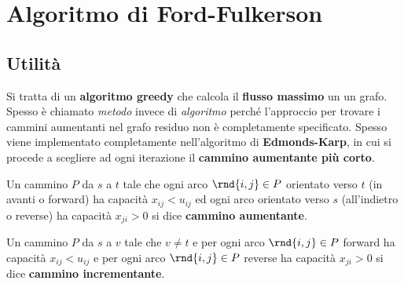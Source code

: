 \documentclass[\main/main.tex]{subfiles}
\begin{document}
\chapter{Algoritmo di Ford-Fulkerson}
\section{Utilità}
Si tratta di un \textbf{algoritmo greedy} che calcola il \textbf{flusso massimo} un un grafo. Spesso è chiamato \textit{metodo} invece di \textit{algoritmo} perché l'approccio per trovare i cammini aumentanti nel grafo residuo non è completamente specificato. Spesso viene implementato completamente nell'algoritmo di \textbf{Edmonds-Karp}, in cui si procede a scegliere ad ogni iterazione il \textbf{cammino aumentante più corto}.

\begin{definition}
  Un cammino \(P\) da \(s\) a \(t\) tale che ogni arco \(\rnd{i,j} \in P\) orientato verso \(t\) (in avanti o forward) ha capacità \(x_{ij}<u_{ij}\) ed ogni arco orientato verso \(s\) (all'indietro o reverse) ha capacità \(x_{ji} > 0\) si dice \textbf{cammino aumentante}.
\end{definition}

\begin{definition}
  Un cammino \(P\) da \(s\) a \(v\) tale che \(v \neq t\) e per ogni arco \(\rnd{i,j} \in P\) forward ha capacità \(x_{ij} < u_{ij}\) e per ogni arco \(\rnd{i,j} \in P\) reverse ha capacità \(x_{ji}>0\) si dice \textbf{cammino incrementante}.
\end{definition}
\clearpage
\end{document}
